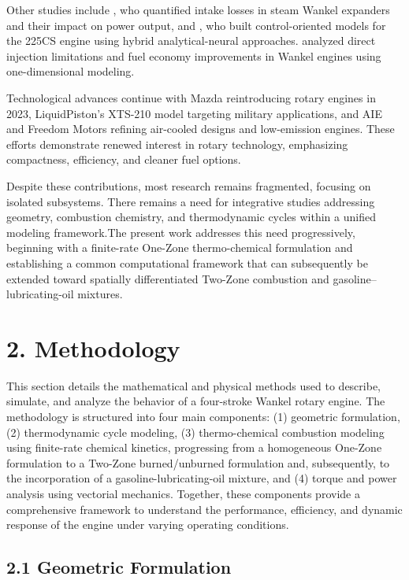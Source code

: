 \documentclass[man,floatsintext,noextraspace]{apa6}
\begin{document}
Other studies include \cite{mukherjee2022}, who quantified intake losses in steam Wankel expanders and their impact on power output, and \cite{chen2020}, who built control-oriented models for the 225CS engine using hybrid analytical-neural approaches. \cite{bailey2018} analyzed direct injection limitations and fuel economy improvements in Wankel engines using one-dimensional modeling.

Technological advances continue with Mazda reintroducing rotary engines in 2023, LiquidPiston's XTS-210 model targeting military applications, and AIE and Freedom Motors refining air-cooled designs and low-emission engines. These efforts demonstrate renewed interest in rotary technology, emphasizing compactness, efficiency, and cleaner fuel options.

Despite these contributions, most research remains fragmented, focusing on isolated subsystems. There remains a need for integrative studies addressing geometry, combustion chemistry, and thermodynamic cycles within a unified modeling framework.The present work addresses this need progressively, beginning with a finite-rate One-Zone thermo-chemical formulation and establishing a common computational
framework that can subsequently be extended toward spatially differentiated Two-Zone combustion and gasoline--lubricating-oil mixtures.


\section{2. Methodology}

This section details the mathematical and physical methods used to describe, simulate, and analyze the behavior of a four-stroke Wankel rotary engine. The methodology is structured into four main components: (1) geometric formulation, (2) thermodynamic cycle modeling, (3) thermo-chemical combustion modeling using finite-rate chemical kinetics, progressing from a homogeneous One-Zone formulation to a Two-Zone burned/unburned formulation and, subsequently, to the incorporation of a gasoline-lubricating-oil mixture, and (4) torque and power analysis using vectorial mechanics. Together, these components provide a comprehensive framework to understand the performance, efficiency, and dynamic response of the engine under varying operating conditions.

\subsection{2.1 Geometric Formulation}
\end{document}
